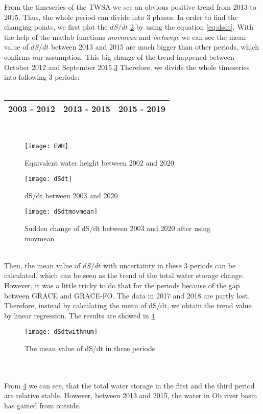 From the timeseries of the TWSA we see an obvious positive trend from 2013 to 2015. Thus, the whole period can divide into 3 phases. In order to find the changing points, we first plot the $dS/dt$ \ref{fig:dsdtall} by using the equation \ref{eq:dsdt}. With the help of the matlab functions \textit{movmean} and \textit{ischange} we can see the mean value of $dS/dt$ between 2013 and 2015 are much bigger than other periods, which confirms our assumption. This big change of the trend happened between October 2012 and September 2015.\ref{fig:dsdtmovmean} Therefore, we divide the whole timeseries into following 3 periods:\\\\
\begin{table}[htbp] \centering
	\begin{tabular}{|l|l|l|}
		\hline
		2003 - 2012 & 2013 - 2015 & 2015 - 2019 \\ \hline
	\end{tabular}
\end{table}\\
\begin{figure}[htbp]
	\centering
	\texttt{[image: EWH]} %
	\caption{Equivalent water height between 2002 and 2020} 
	\label{fig:EWHs}
\end{figure}
\begin{figure}[htbp]
	\centering
	\texttt{[image: dSdt]} %
	\caption{dS/dt between 2003 and 2020} 
	\label{fig:dsdtall}
\end{figure}
\begin{figure}[htbp]
	\centering
	\texttt{[image: dSdtmovmean]} %
	\caption{Sudden change of dS/dt between 2003 and 2020 after using movmean} 
	\label{fig:dsdtmovmean}
\end{figure}\\
Then, the mean value of $dS/dt$ with uncertainty in these 3 periods can be calculated. which can be seen as the trend of the total water storage change. However, it was a little tricky to do that for the periods because of the gap between GRACE and GRACE-FO. The data in 2017 and 2018 are partly lost. Therefore, instead by calculating the mean of dS/dt, we obtain the trend value by linear regression. The results are showed in \ref{fig:dsdtwithnum}
\begin{figure}[htbp]
	\centering
	\texttt{[image: dSdtwithnum]} %
	\caption{The mean value of dS/dt in three periods} 
	\label{fig:dsdtwithnum}
\end{figure}\\\\
From \ref{fig:dsdtwithnum} we can see, that the total water storage in the first and the third period are relative stable. However, between 2013 and 2015, the water in Ob river basin has gained from outside. 
\clearpage
